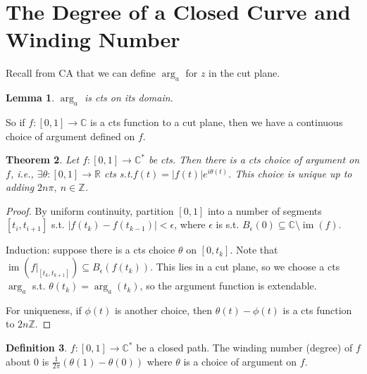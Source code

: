 \documentclass{article}
\theoremstyle{definition}
\newtheorem{defn}{Definition}[section]
\theoremstyle{remark}
\theoremstyle{plain}
\newtheorem{lem}[defn]{Lemma}
\newtheorem{thm}[defn]{Theorem}
\newcommand{\ZZ}{\mathbb{Z}}
\newcommand{\RR}{\mathbb{R}}
\newcommand{\CC}{\mathbb{C}}
\newcommand{\im}{\operatorname{im}}
\begin{document}
\section{The Degree of a Closed Curve and Winding Number}
Recall from CA that we can define $\operatorname{arg}_a$ for $z$ in the cut plane.
\begin{lem}
    $\arg_a$ is cts on its domain.
\end{lem}
So if $f:[0,1]\to \CC$ is a cts function to a cut plane, then we have a continuous choice of argument defined on $f$.
\begin{thm}
    Let $f:[0,1]\to\CC^\ast$ be cts. Then there is a cts choice of argument on $f$, i.e., $\exists\theta:[0,1]\to\RR$ cts s.t.$f(t)=|f(t)|e^{i\theta(t)}$. This choice is unique up to adding $2n\pi,\ n\in\ZZ$.
\end{thm}
\begin{proof}
    By uniform continuity, partition $[0,1]$ into a number of segments $[t_i,t_{i+1}]$ s.t. $|f(t_k)-f(t_{k-1})|<\epsilon$, where $\epsilon$ is s.t. $B_\epsilon(0)\subseteq \CC\setminus\im(f)$. 

    Induction: suppose there is a cts choice $\theta$ on $[0,t_k]$. Note that $\im(f|_{[t_k,t_{k+1}]})\subseteq B_\epsilon(f(t_k))$. This lies in a cut plane, so we choose a cts $\operatorname{arg}_a$ s.t. $\theta(t_k)=\arg_a(t_k)$, so the argument function is extendable.

    For uniqueness, if $\phi(t)$ is another choice, then $\theta(t)-\phi(t)$ is a cts function to $2n\ZZ$.
\end{proof}
\begin{defn}
    $f:[0,1]\to\CC^\ast$ be a closed path. The winding number (degree) of $f$ about $0$ is $\frac{1}{2\pi}(\theta(1)-\theta(0))$ where $\theta$ is a choice of argument on $f$.
\end{defn}
\end{document}

